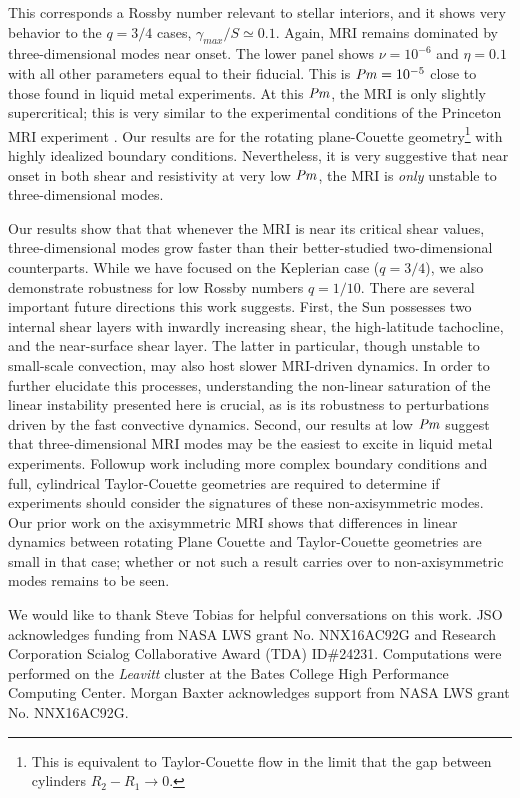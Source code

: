 \documentclass[aps,prl,reprint,superscriptaddress]{revtex4-1}
\newcommand{\Prm}{\mbox{\textit{Pm}}}
\begin{document}
This corresponds a Rossby number relevant to stellar interiors, and it shows very behavior to the $q=3/4$ cases, $\gamma_{max}/S \simeq 0.1$.
Again, MRI remains dominated by three-dimensional modes near onset.
The lower panel shows $\nu = 10^{-6}$ and $\eta = 0.1$ with all other parameters equal to their fiducial. 
This is $\Prm = 10^{-5}$ close to those found in liquid metal experiments.
At this $\Prm$, the MRI is only slightly supercritical; this is very similar to the experimental conditions of the Princeton MRI experiment \citep{2002JFM...462..365G}.
Our results are for the rotating plane-Couette geometry\footnote{This is equivalent to Taylor-Couette flow in the limit that the gap between cylinders $R_2 - R_1 \to 0$.} with highly idealized boundary conditions.
Nevertheless, it is very suggestive that near onset in both shear and resistivity at very low $\Prm$, the MRI is \emph{only} unstable to three-dimensional modes.

Our results show that that whenever the MRI is near its critical shear values,  three-dimensional modes grow faster than their better-studied two-dimensional counterparts.
While we have focused on the Keplerian case ($q=3/4$), we also demonstrate robustness for low Rossby numbers $q=1/10$.
There are several important future directions this work suggests.
First, the Sun possesses two internal shear layers with inwardly increasing shear, the high-latitude tachocline, and the near-surface shear layer.
The latter in particular, though unstable to small-scale convection, may also host slower MRI-driven dynamics.
In order to further elucidate this processes, understanding the non-linear saturation of the linear instability presented here is crucial, as is its robustness to perturbations driven by the fast convective dynamics.
Second, our results at low $\Prm$ suggest that three-dimensional MRI modes may be the easiest to excite in liquid metal experiments.
Followup work including more complex boundary conditions and full, cylindrical Taylor-Couette geometries are required to determine if experiments should consider the signatures of these non-axisymmetric modes.
Our prior work on the axisymmetric MRI \citep{2017ApJ...841....1C,2017ApJ...841....2C} shows that differences in linear dynamics between rotating Plane Couette and Taylor-Couette geometries are small in that case; whether or not such a result carries over to non-axisymmetric modes remains to be seen.


\begin{acknowledgments}
We would like to thank Steve Tobias for helpful conversations on this work.
JSO acknowledges funding from NASA LWS grant No. NNX16AC92G and Research Corporation Scialog Collaborative Award (TDA) ID\#24231. Computations were performed on the \emph{Leavitt} cluster at the Bates College High Performance Computing Center.
Morgan Baxter acknowledges support from NASA LWS grant No. NNX16AC92G.
\end{acknowledgments}


\end{document}
